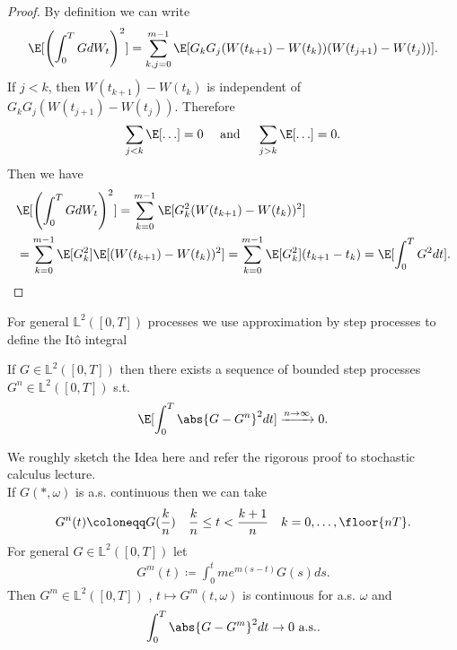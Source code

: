 \begin{proof}
  By definition we can write 
  \begin{align*}
    \E[\left( \int_0^{T} G dW_t  \right)^2 ] = \sum_{k,j=0}^{m-1} \E[G_kG_j(W(t_{k+1})-W(t_k))(W(t_{j+1})-W(t_j))] 
  .\end{align*}
  If $j < k$, then $W(t_{k+1}) -W(t_k)$ is independent of $G_kG_j(W(t_{j+1})-W(t_j))$. Therefore 
  \begin{align*}
    \sum_{j<k}\E[\ldots ] = 0 \quad \text{ and }  \quad \sum_{j>k}\E[\ldots ] = 0
  .\end{align*}
  Then we have 
  \begin{align*}
   & \E[\left( \int_0^{T} GdW_t  \right)^2 ] = \sum_{k=0}^{m-1} \E[G_k^2(W(t_{k+1})-W(t_k))^2]  \\
                                            &= \sum_{k=0}^{m-1} \E[G_k^2]\E[(W(t_{k+1})-W(t_k))^2]                               = \sum_{k=0}^{m-1} \E[G_k^2](t_{k+1}-t_k) 
                                          = \E[\int_0^{T} G^2dt ] 
  .\end{align*}
\end{proof}
For general $\mathbb{L}^2([0,T])$ processes we use approximation by step processes to define the It\^o integral 
\begin{lemma}
  If $G \in  \mathbb{L}^2([0,T])$  then there exists a sequence of bounded step processes  $G^{n} \in  \mathbb{L}^2([0,T])$  s.t. 
  \begin{align*}
   \E[\int_0^{T} \abs{G - G^{n} }^2 dt ] \xrightarrow{n\to \infty} 0
  .\end{align*}
\end{lemma}
  We roughly sketch the Idea here and refer the rigorous proof to stochastic calculus lecture. \\[1ex]
  If $G(*,\omega )$  is a.s. continuous then we can take  
 \begin{align*}
   G^{n}(t) \coloneqq  G(\frac{k}{n})  \quad \frac{k}{n} \le t < \frac{k+1}{n} \quad k=0,\ldots ,\floor{nT}
 .\end{align*}
 For general $G \in  \mathbb{L}^2([0,T])$ let 
 \begin{align*}
  G^{m}(t) \coloneqq  \int_0^{t} m e^{m(s-t)}G(s) ds   
 .\end{align*}
 Then $G^{m} \in  \mathbb{L}^2([0,T]) $ , $t \mapsto G^{m}(t,\omega ) $ is continuous for a.s. $\omega $ and 
 \begin{align*}
  \int_0^{T} \abs{G - G^{m} }^2 dt \to 0 \text{ a.s.}
 .\end{align*}


